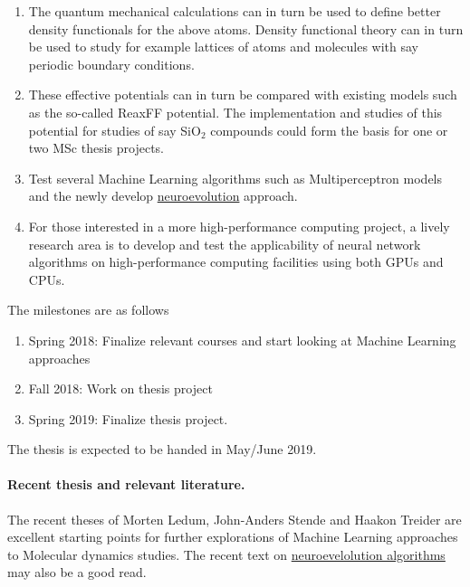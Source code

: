 \documentclass[%
oneside,                 %
final,                   %
10pt]{article}
\begin{document}
\begin{enumerate}
\item The quantum mechanical calculations can in turn be used to define better density functionals for the above atoms. Density functional theory can in turn be used to study for example lattices of atoms and molecules with say periodic boundary conditions.  

\item These effective potentials can in turn be compared with existing models such as the so-called ReaxFF potential. The implementation and studies of this potential for studies of say SiO$_2$ compounds could form the basis for one or two MSc thesis projects. 

\item Test several Machine Learning algorithms such as Multiperceptron models and the newly develop \href{{https://www.oreilly.com/ideas/neuroevolution-a-different-kind-of-deep-learning}}{neuroevolution} approach. 

\item For those interested in a more high-performance computing project, a lively research area is to develop and test the applicability of neural network algorithms on high-performance computing facilities using both GPUs and CPUs. 
\end{enumerate}

\noindent
The milestones are as follows
\begin{enumerate}
\item Spring 2018: Finalize relevant courses and start looking at Machine Learning approaches

\item Fall 2018: Work on thesis project

\item Spring 2019: Finalize thesis project.
\end{enumerate}

\noindent
The thesis is expected to be handed in May/June  2019.



\paragraph{Recent thesis and relevant literature.}
The recent theses of Morten Ledum, John-Anders Stende and Haakon Treider are excellent starting points for further explorations of Machine Learning approaches to Molecular dynamics studies. The recent text on \href{{https://www.oreilly.com/ideas/neuroevolution-a-different-kind-of-deep-learning}}{neuroevelolution algorithms}  may also be a good read.









\end{document}
